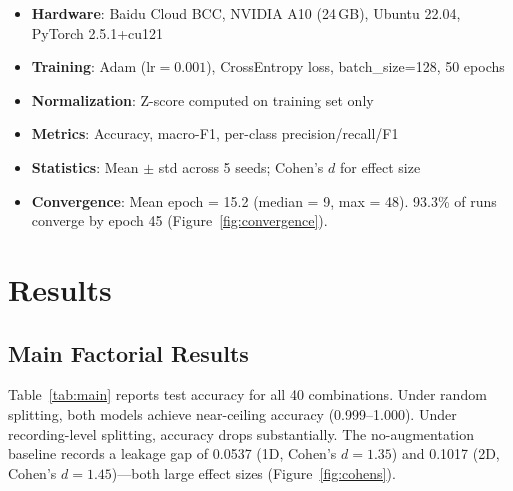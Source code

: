 ﻿\documentclass[11pt,a4paper]{article}
\begin{document}
\begin{itemize}[nosep]
    \item \textbf{Hardware}: Baidu Cloud BCC, NVIDIA A10 (24\,GB), Ubuntu 22.04, PyTorch 2.5.1+cu121
    \item \textbf{Training}: Adam ($\text{lr}=0.001$), CrossEntropy loss, batch\_size=128, 50 epochs
    \item \textbf{Normalization}: Z-score computed on training set only
    \item \textbf{Metrics}: Accuracy, macro-F1, per-class precision/recall/F1
    \item \textbf{Statistics}: Mean $\pm$ std across 5 seeds; Cohen's $d$ for effect size
    \item \textbf{Convergence}: Mean epoch = 15.2 (median = 9, max = 48). 93.3\% of runs converge by epoch 45 (Figure~\ref{fig:convergence}).
\end{itemize}

\section{Results}
\label{sec:results}

\subsection{Main Factorial Results}

Table~\ref{tab:main} reports test accuracy for all 40 combinations. Under random splitting, both models achieve near-ceiling accuracy (0.999--1.000). Under recording-level splitting, accuracy drops substantially. The no-augmentation baseline records a leakage gap of 0.0537 (1D, Cohen's $d=1.35$) and 0.1017 (2D, Cohen's $d=1.45$)---both large effect sizes (Figure~\ref{fig:cohens}).
\end{document}
